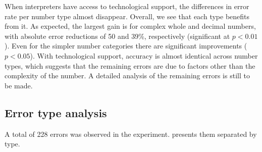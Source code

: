 \documentclass[output=paper]{langsci/langscibook}
\begin{document}
When interpreters have access to technological support, the differences in error rate per number type almost disappear. Overall, we see that each type benefits from it. As expected, the largest gain is for complex whole and decimal numbers, with absolute error reductions of 50 and 39\%, respectively (significant at $p < 0.01$). Even for the simpler number categories there are significant improvements ($p < 0.05$). With technological support, accuracy is almost identical across number types, which suggests that the remaining errors are due to factors other than the complexity of the number. A detailed analysis of the remaining errors is still to be made.   

\subsection{Error type analysis}\largerpage[1]

A total of 228 errors was observed in the experiment.  presents them separated by type.
\end{document}
